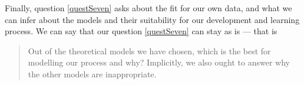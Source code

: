 Finally, question \ref{questSeven} asks about the fit for our own data, and what we can
infer about the models and their suitability for our development and learning
process.
We can say that our question \ref{questSeven} can stay as is --- that is
\begin{quote}
  Out of the theoretical models we have chosen, which is the best for modelling
  our process and why?
  Implicitly, we also ought to answer why the other models are inappropriate.
\end{quote} \label{qq7}
